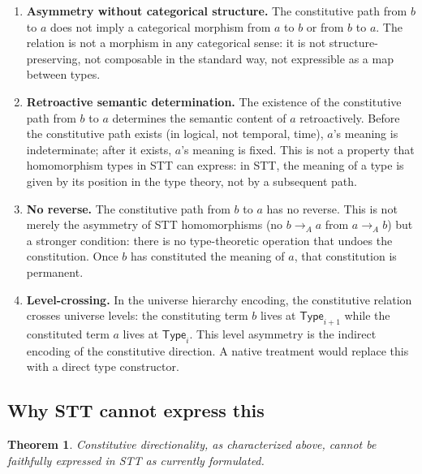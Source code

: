 \documentclass[12pt]{article}
\newtheorem{theorem}{Theorem}
\theoremstyle{definition}
\theoremstyle{remark}
\newcommand{\Type}[1]{\mathsf{Type}_{#1}}
\begin{document}
\begin{enumerate}[leftmargin=2em]
\item \textbf{Asymmetry without categorical structure.} The constitutive path from $b$ to $a$ does not imply a categorical morphism from $a$ to $b$ or from $b$ to $a$. The relation is not a morphism in any categorical sense: it is not structure-preserving, not composable in the standard way, not expressible as a map between types.

\item \textbf{Retroactive semantic determination.} The existence of the constitutive path from $b$ to $a$ determines the semantic content of $a$ retroactively. Before the constitutive path exists (in logical, not temporal, time), $a$'s meaning is indeterminate; after it exists, $a$'s meaning is fixed. This is not a property that homomorphism types in STT can express: in STT, the meaning of a type is given by its position in the type theory, not by a subsequent path.

\item \textbf{No reverse.} The constitutive path from $b$ to $a$ has no reverse. This is not merely the asymmetry of STT homomorphisms (no $b \to_A a$ from $a \to_A b$) but a stronger condition: there is no type-theoretic operation that undoes the constitution. Once $b$ has constituted the meaning of $a$, that constitution is permanent.

\item \textbf{Level-crossing.} In the universe hierarchy encoding, the constitutive relation crosses universe levels: the constituting term $b$ lives at $\Type{i+1}$ while the constituted term $a$ lives at $\Type{i}$. This level asymmetry is the indirect encoding of the constitutive direction. A native treatment would replace this with a direct type constructor.
\end{enumerate}

\subsection{Why STT cannot express this}

\begin{theorem}
Constitutive directionality, as characterized above, cannot be faithfully expressed in STT as currently formulated.
\end{theorem}
\end{document}
